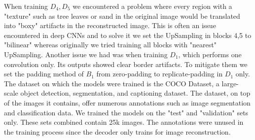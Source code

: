 When training $D_4, D_5$ we encountered a problem where every region with a "texture" such as tree leaves or sand in the original image would be translated into "boxy" artifacts in the reconstructed image. This is often an issue encountered in deep CNNs and to solve it we set the UpSampling in blocks 4,5 to "bilinear" whereas originally we tried training all blocks with "nearest" UpSampling. Another issue we had was when training $D_1$, which performs one convolution only. Its outputs showed clear border artifacts. To mitigate them we set the padding method of $B_1$ from zero-padding to replicate-padding in $D_1$ only.\\

The dataset on which the models were trained is the COCO Dataset, a large-scale object detection, segmentation, and captioning dataset. The dataset, on top of the images it contains, offer numerous annotations such as image segmentation and classification data. We trained the models on the "test" and "validation" sets only. These sets combined contain 25k images. The annotations were unused in the training process since the decoder only trains for image reconstruction.